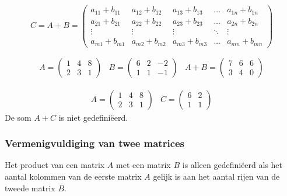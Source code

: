 \[
C=A+B=\left( \begin{matrix}
a_{11}+b_{11} & a_{12}+b_{12} & a_{13}+b_{13} & \ldots & a_{1n}+b_{1n} \\
a_{21}+b_{21} & a_{22}+b_{22} & a_{23}+b_{23} & \ldots & a_{2n}+b_{2n} \\
\vdots & \vdots & \vdots & \ddots & \vdots \\
a_{m1}+b_{m1} & a_{m2}+b_{m2} & a_{m3}+b_{m3} & \ldots & a_{mn}+b_{mn}
\end{matrix} \right)
\]


\begin{voorbeeld}
	\[
\begin{array}{lll}
A= \left( \begin{matrix}
1 & 4 & 8 \\
2 & 3 & 1
\end{matrix} \right) &
B= \left( \begin{matrix}
6 & 2 & -2 \\
1 & 1 & -1 
\end{matrix} \right) &
A+B=\left( \begin{matrix}
7 & 6 & 6 \\
3 & 4 & 0
\end{matrix} \right)
\end{array}
\]

\end{voorbeeld}	

\begin{voorbeeld}
	\[ 
\begin{array}{ll}
A= \left( \begin{matrix}
1 & 4 & 8 \\
2 & 3 & 1
\end{matrix} \right) &
C= \left( \begin{matrix}
6 & 2 \\
1 & 1  
\end{matrix} \right)
\end{array}
\]
De som $A+C$ is niet gedefini\"{e}erd.
\end{voorbeeld}


\subsubsection{Vermenigvuldiging van twee matrices}

Het product van een matrix $A$ met een matrix $B$ is alleen gedefini\"{e}erd als het aantal kolommen van de eerste matrix $A$ gelijk is aan het aantal rijen van de tweede matrix $B$.\\


